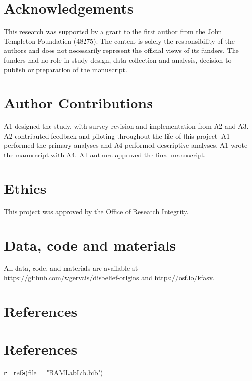 \documentclass[english,man,mask]{article}
\newenvironment{Shaded}{\begin{snugshade}}{\end{snugshade}}
\newcommand{\DataTypeTok}[1]{\textcolor[rgb]{0.13,0.29,0.53}{#1}}
\newcommand{\KeywordTok}[1]{\textcolor[rgb]{0.13,0.29,0.53}{\textbf{#1}}}
\newcommand{\NormalTok}[1]{#1}
\newcommand{\StringTok}[1]{\textcolor[rgb]{0.31,0.60,0.02}{#1}}
\begin{document}
\pagebreak

\hypertarget{acknowledgements}{%
\section{Acknowledgements}\label{acknowledgements}}

This research was supported by a grant to the first author from the John Templeton Foundation (48275). The content is solely the responsibility of the authors and does not necessarily represent the official views of its funders. The funders had no role in study design, data collection and analysis, decision to publish or preparation of the manuscript.

\hypertarget{author-contributions}{%
\section{Author Contributions}\label{author-contributions}}

A1 designed the study, with survey revision and implementation from A2 and A3. A2 contributed feedback and piloting throughout the life of this project. A1 performed the primary analyses and A4 performed descriptive analyses. A1 wrote the manuscript with A4. All authors approved the final manuscript.

\hypertarget{ethics}{%
\section{Ethics}\label{ethics}}

This project was approved by the Office of Research Integrity.

\hypertarget{data-code-and-materials}{%
\section{Data, code and materials}\label{data-code-and-materials}}

All data, code, and materials are available at \url{https://github.com/wgervais/disbelief-origins} and \url{https://osf.io/kfasv}.

\pagebreak

\hypertarget{references}{%
\section{References}\label{references}}

\newpage

\hypertarget{references-1}{%
\section{References}\label{references-1}}

\begin{Shaded}
\begin{Highlighting}[]
\KeywordTok{r_refs}\NormalTok{(}\DataTypeTok{file =} \StringTok{"BAMLabLib.bib"}\NormalTok{)}
\end{Highlighting}
\end{Shaded}

\begingroup
\setlength{\parindent}{-0.5in}
\setlength{\leftskip}{0.5in}

\hypertarget{refs}{}

\endgroup
\end{document}

